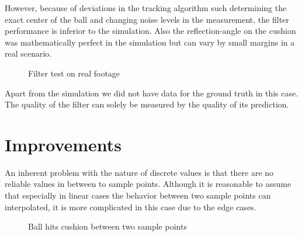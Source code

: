 \documentclass[titlepage, a4paper, 11pt]{scrartcl}
\begin{document}
However, because of deviations in the tracking algorithm such determining the exact center of the ball and changing noise levels in the measurement, 
the filter performance is inferior to the simulation. Also the reflection-angle on the cushion was mathematically perfect in the simulation
but can vary by small margins in a real scenario.

\begin{figure}[H]
    \centering
    \caption{Filter test on real footage}
    \label{fig:realfootage}
\end{figure}

Apart from the simulation we did not have data for the ground truth in this case. 
The quality of the filter can solely be measured by the quality of its prediction.

\section{Improvements}

An inherent problem with the nature of discrete values is that there are no reliable values in between to sample points. 
Although it is reasonable to assume that especially in linear cases the behavior between two sample points can interpolated, 
it is more complicated in this case due to the edge cases.

\begin{figure}[H]
    \centering
    \caption{Ball hits cushion between two sample points}
    \label{fig:edge-case}
\end{figure}
\end{document}
